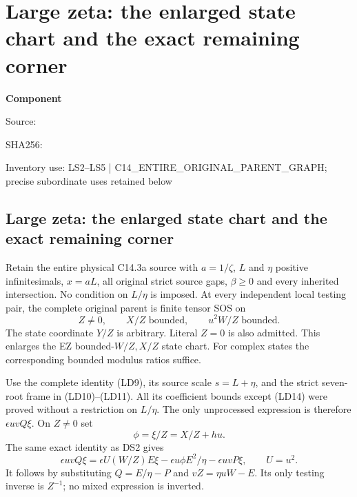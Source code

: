 \chapter{Large zeta: the enlarged state chart and the exact remaining corner}
\label{component:p8635816e42a0}
\noindent\textbf{Component }\par
{\small\noindent Source: \par}
{\small\noindent SHA256: \par}
{\small\noindent Inventory use: LS2--LS5 | C14\_\allowbreak{}ENTIRE\_\allowbreak{}ORIGINAL\_\allowbreak{}PARENT\_\allowbreak{}GRAPH; precise subordinate uses retained below\par}
\medskip
\section{Large zeta: the enlarged state chart and the exact remaining corner}
\label{p8635816e42a0:sec:r17-large-zeta-damped-state}

\begin{proposition}
Retain the entire physical C14.3a source with $a=1/\zeta$, $L$ and
$\eta$ positive infinitesimals, $x=aL$, all original strict source
gaps, $\beta\ge0$ and every inherited intersection. No condition
on $L/\eta$ is imposed. At every independent local testing pair,
the complete original parent is finite tensor SOS on
\[
 Z\ne0,\qquad X/Z\text{ bounded},\qquad
                         u^2W/Z\text{ bounded}.        \tag{LS1}
\]
The state coordinate $Y/Z$ is arbitrary. Literal $Z=0$ is also
admitted. This enlarges the EZ bounded-$W/Z,X/Z$ state chart.
For complex states the corresponding bounded modulus ratios suffice.
\end{proposition}

Use the complete identity (LD9), its source scale $s=L+\eta$,
and the strict seven-root frame in (LD10)--(LD11). All its coefficient
bounds except (LD14) were proved without a restriction on $L/\eta$.
The only unprocessed expression is therefore $\epsilon uvQ\xi$.
On $Z\ne0$ set
\[
 \phi=\xi/Z=X/Z+hu.
\]
The same exact identity as DS2 gives
\begin{equation}
 \epsilon uvQ\xi
  =\epsilon U(W/Z)E\xi
     -\epsilon u\phi E^2/\eta-\epsilon uvP\xi,
 \qquad U=u^2.                                      \tag{LS2}
\end{equation}
It follows by substituting $Q=E/\eta-P$ and $vZ=\eta uW-E$.
Its only testing inverse is $Z^{-1}$; no mixed expression is inverted.

